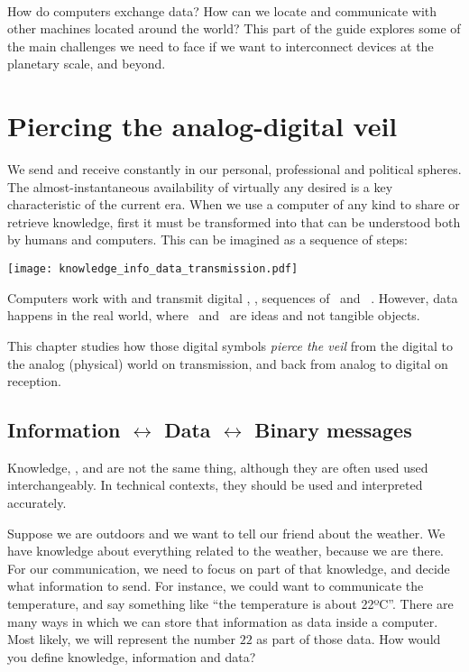 \ \\[-10cm]
How do computers exchange data? How can we locate and communicate with other machines located around the world?
This part of the guide explores some of the main challenges we need to face if we want to interconnect devices at the planetary scale, and beyond.


\chapter{Piercing the analog-digital veil}\label{sec:piercing}

We send and receive  constantly in our personal, professional and political spheres.
The almost-instantaneous availability of virtually any desired  is a key characteristic of the current era.
% 
When we use a computer of any kind to share or retrieve knowledge, first it must be transformed into  that can be understood both by humans and computers.
This can be imagined as a sequence of steps:
\begin{center}
\texttt{[image: knowledge\_info\_data\_transmission.pdf]}
\end{center}

Computers work with and transmit digital , \ie, sequences of 
\zero\ and \one\ . 
However, data  happens in the real world, where \zero\ and \one\ are ideas and not tangible objects.

This chapter studies how those digital symbols \textit{pierce the veil}  
from the digital to the analog (physical) world on transmission, and back from analog to digital on reception.


\section{Information $\leftrightarrow$ Data $\leftrightarrow$ Binary messages}\label{sec:piercing:information_binary}

Knowledge, , and  are not the same thing, 
although they are often used used interchangeably. In technical contexts, they should be used and interpreted accurately.
% 
\begin{exercise}
Suppose we are outdoors and we want to tell our friend about the weather.
% 
We have knowledge about everything related to the weather, because we are there.
For our communication, we need to focus on part of that knowledge, and decide what information to send.
For instance, we could want to communicate the temperature, and say something like ``the temperature is about 22ºC''.
% 
There are many ways in which we can store that information as data inside a computer. Most likely, we will represent the number 
$22$ as part of those data. How would you define knowledge, information and data?
\end{exercise}


